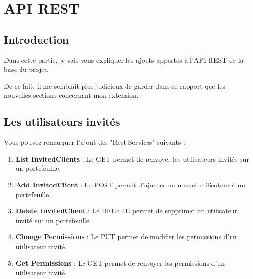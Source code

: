 \section{API REST}

\subsection{Introduction}

\begin{flushleft}
Dans cette partie, je vais vous expliquer les ajouts apportés à l'API-REST de la base du projet. 
\end{flushleft}
\begin{flushleft}
De ce fait, il me semblait plus judicieux de garder dans ce rapport que les nouvelles sections concernant mon extension.
\end{flushleft}

\subsection{Les utilisateurs invités}

\begin{flushleft}
Vous pouvez remarquer l'ajout des "Rest Services" suivants :
\end{flushleft}

\begin{enumerate}
\item \textbf{List InvitedClients} :\newline
Le GET permet de renvoyer les utilisateurs invités sur un portefeuille.
\item \textbf{Add InvitedClient} :\newline
Le POST permet d'ajouter un nouvel utilisateur à un portefeuille.
\item \textbf{Delete InvitedClient} :\newline
Le DELETE permet de supprimer un utilisateur invité sur un portefeuille.
\item \textbf{Change Permissions} :\newline
Le PUT permet de modifier les permissions d'un utilisateur invité.
\item \textbf{Get Permissions} :\newline
Le GET permet de renvoyer les permissions d'un utilisateur invité.
\end{enumerate}


